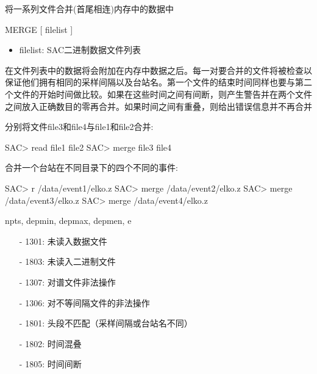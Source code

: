 \label{cmd:merge}

将一系列文件合并(首尾相连)内存中的数据中

\begin{SACSTX}
MERGE [ filelist ]
\end{SACSTX}

\begin{itemize}
\item filelist: SAC二进制数据文件列表
\end{itemize}

在文件列表中的数据将会附加在内存中数据之后。每一对要合并的文件将被检查以保证他们拥有相同的采样间隔以及台站名。第一个文件的结束时间同样也要与第二个文件的开始时间做比较。如果在这些时间之间有间断，则产生警告并在两个文件之间放入正确数目的零再合并。如果时间之间有重叠，则给出错误信息并不再合并

分别将文件file3和file4与file1和file2合并:
\begin{SACCode}
SAC> read file1 file2
SAC> merge file3 file4
\end{SACCode}

合并一个台站在不同目录下的四个不同的事件:
\begin{SACCode}
SAC> r /data/event1/elko.z
SAC> merge /data/event2/elko.z
SAC> merge /data/event3/elko.z
SAC> merge /data/event4/elko.z
\end{SACCode}

npts, depmin, depmax, depmen, e

\begin{itemize}
\item[-]1301: 未读入数据文件
\item[-]1803: 未读入二进制文件
\item[-]1307: 对谱文件非法操作
\item[-]1306: 对不等间隔文件的非法操作
\item[-]1801: 头段不匹配（采样间隔或台站名不同）
\item[-]1802: 时间混叠
\end{itemize}

\begin{itemize}
\item[-]1805: 时间间断
\end{itemize}

